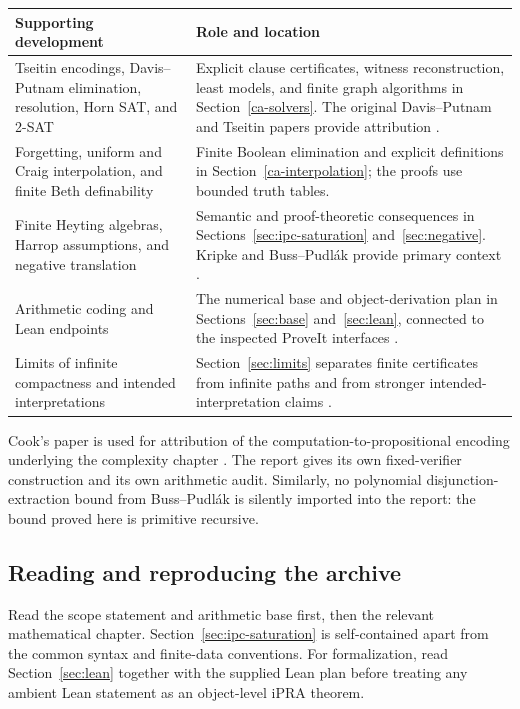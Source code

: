 \begin{center}\small
\begin{tabularx}{\textwidth}{@{}>{\raggedright\arraybackslash}p{}>{\raggedright\arraybackslash}X@{}}
\toprule
Supporting development & Role and location\\
\midrule
Tseitin encodings, Davis--Putnam elimination, resolution, Horn SAT, and 2-SAT
& Explicit clause certificates, witness reconstruction, least models, and
finite graph algorithms in Section~\ref{ca-solvers}. The original
Davis--Putnam and Tseitin papers provide attribution
\cite{DP1960,Tseitin1968}.\\[4pt]
Forgetting, uniform and Craig interpolation, and finite Beth definability
& Finite Boolean elimination and explicit definitions in
Section~\ref{ca-interpolation}; the proofs use bounded truth tables.\\[4pt]
Finite Heyting algebras, Harrop assumptions, and negative translation
& Semantic and proof-theoretic consequences in
Sections~\ref{sec:ipc-saturation} and~\ref{sec:negative}. Kripke and
Buss--Pudl\'ak provide primary context \cite{kripke1965,buss-pudlak2001}.\\[4pt]
Arithmetic coding and Lean endpoints
& The numerical base and object-derivation plan in
Sections~\ref{sec:base} and~\ref{sec:lean}, connected to the inspected
ProveIt interfaces \cite{proveit}.\\[4pt]
Limits of infinite compactness and intended interpretations
& Section~\ref{sec:limits} separates finite certificates from infinite
paths and from stronger intended-interpretation claims
\cite{burgess1981}.\\
\bottomrule
\end{tabularx}
\end{center}

Cook's paper is used for attribution of the computation-to-propositional
encoding underlying the complexity chapter \cite{cook1971}. The report gives
its own fixed-verifier construction and its own arithmetic audit. Similarly,
no polynomial disjunction-extraction bound from Buss--Pudl\'ak is silently
imported into the report: the bound proved here is primitive recursive.

\subsection{Reading and reproducing the archive}

Read the scope statement and arithmetic base first, then the relevant
mathematical chapter. Section~\ref{sec:ipc-saturation} is self-contained
apart from the common syntax and finite-data conventions. For formalization,
read Section~\ref{sec:lean} together with the supplied Lean plan before
treating any ambient Lean statement as an object-level iPRA theorem.

